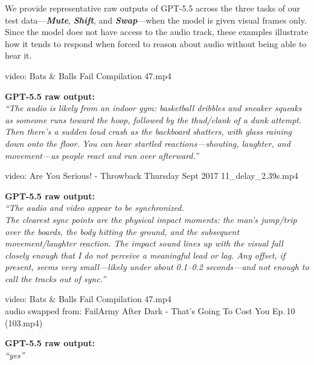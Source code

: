 \documentclass{llmxive}
\providecommand{\shift}{\textbf{\textit{Shift}}\xspace}
\providecommand{\mute}{\textbf{\textit{Mute}}\xspace}
\providecommand{\swap}{\textbf{\textit{Swap}}\xspace}
\begin{document}
We provide representative raw outputs of GPT-5.5 across the three tasks of our
test data---\mute, \shift, and \swap---when the model
is given visual frames only. Since the model does not have access to the
audio track, these examples illustrate how it tends to respond when forced to
reason about audio without being able to hear it.

\begin{tcolorbox}[gptbox,title={Task: \mute \textemdash{} What does the audio sound like?}]
\begin{tcolorbox}[videoline]
video: Bats \& Balls Fail Compilation 47.mp4
\end{tcolorbox}
\textbf{GPT-5.5 raw output:}\\
\textit{``The audio is likely from an indoor gym: basketball dribbles and
sneaker squeaks as someone runs toward the hoop, followed by the thud/clank
of a dunk attempt. Then there's a sudden loud crash as the backboard
shatters, with glass raining down onto the floor. You can hear startled
reactions---shouting, laughter, and movement---as people react and run over
afterward.''}
\end{tcolorbox}

\begin{tcolorbox}[gptbox,title={Task: \shift \textemdash{} Is the audio in sync with the video?}]
\begin{tcolorbox}[videoline]
video: Are You Serious! - Throwback Thursday Sept 2017 11\_delay\_2.39s.mp4
\end{tcolorbox}
\textbf{GPT-5.5 raw output:}\\
\textit{``The audio and video appear to be synchronized.\\[2pt]
The clearest sync points are the physical impact moments: the man's
jump/trip over the boards, the body hitting the ground, and the subsequent
movement/laughter reaction. The impact sound lines up with the visual fall
closely enough that I do not perceive a meaningful lead or lag. Any offset,
if present, seems very small---likely under about 0.1--0.2 seconds---and not
enough to call the tracks out of sync.''}
\end{tcolorbox}

\begin{tcolorbox}[gptbox,title={Task: \swap \textemdash{} Does the audio match the video content?}]
\begin{tcolorbox}[videoline]
video: Bats \& Balls Fail Compilation 47.mp4 \\
audio swapped from: FailArmy After Dark - That's Going To Cost You Ep.\,10 (103.mp4)
\end{tcolorbox}
\textbf{GPT-5.5 raw output:}\\
\textit{``yes''}
\end{tcolorbox}
\end{document}
